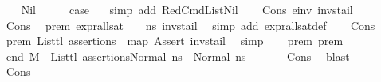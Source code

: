 \begin{isabellebody}
\ \ \isamarkupfalse%
\ Nil\isanewline
\ \ \isamarkupfalse%
\ \isamarkupfalse%
\ {\isacharquery}{\kern0pt}case\ \ \isamarkupfalse%
\ {\isacharparenleft}{\kern0pt}simp\ add{\isacharcolon}{\kern0pt}\ RedCmdListNil{\isacharparenright}{\kern0pt}\isanewline
{}\isamarkupfalse%
\isanewline
\ \ \isamarkupfalse%
\ {\isacharparenleft}{\kern0pt}Cons\ e{\isacharunderscore}{\kern0pt}inv\ invs{\isacharunderscore}{\kern0pt}tail{\isacharparenright}{\kern0pt}\isanewline
\ \ \isamarkupfalse%
\ Cons{\isacharparenleft}{\kern0pt}{}{\isacharparenright}{\kern0pt}\ \isamarkupfalse%
\ prem{}{\isacharcolon}{\kern0pt}\ {\isachardoublequoteopen}expr{\isacharunderscore}{\kern0pt}all{\isacharunderscore}{\kern0pt}sat\ {\isasymLambda}\ {\isasymGamma}\ {\isasymOmega}\ ns{}\ invs{\isacharunderscore}{\kern0pt}tail{\isachardoublequoteclose}\ \isamarkupfalse%
\ {\isacharparenleft}{\kern0pt}simp\ add{\isacharcolon}{\kern0pt}\ expr{\isacharunderscore}{\kern0pt}all{\isacharunderscore}{\kern0pt}sat{\isacharunderscore}{\kern0pt}def{\isacharparenright}{\kern0pt}\isanewline
\ \ \isamarkupfalse%
\ Cons{\isacharparenleft}{\kern0pt}{}{\isacharparenright}{\kern0pt}\ \isamarkupfalse%
\ prem{}{\isacharcolon}{\kern0pt}\ {\isachardoublequoteopen}List{\isachardot}{\kern0pt}tl\ assertions\ {\isacharequal}{\kern0pt}\ map\ Assert\ invs{\isacharunderscore}{\kern0pt}tail{\isachardoublequoteclose}\ \isamarkupfalse%
\ simp\isanewline
\ \ \isamarkupfalse%
\ prem{}\ prem{}\ \isamarkupfalse%
\ end{}{\isacharcolon}{\kern0pt}\ {\isachardoublequoteopen}M{\isacharcomma}{\kern0pt}{\isasymLambda}{\isacharcomma}{\kern0pt}{\isasymGamma}{\isacharcomma}{\kern0pt}{\isasymOmega}\ {\isasymturnstile}\ {\isasymlangle}List{\isachardot}{\kern0pt}tl\ assertions{\isacharcomma}{\kern0pt}Normal\ ns{}{\isasymrangle}\ {\isacharbrackleft}{\kern0pt}{\isasymrightarrow}{\isacharbrackright}{\kern0pt}\ Normal\ ns{}{\isachardoublequoteclose}\ \isanewline
\ \ \ \ \isamarkupfalse%
\ Cons{\isacharparenleft}{\kern0pt}{}{\isacharparenright}{\kern0pt}\ \isamarkupfalse%
\ blast\isanewline
\isanewline
\ \ \isamarkupfalse%
\ Cons{\isacharparenleft}{\kern0pt}{}{\isacharparenright}{\kern0pt}\ \isamarkupfalse%

\end{isabellebody}
